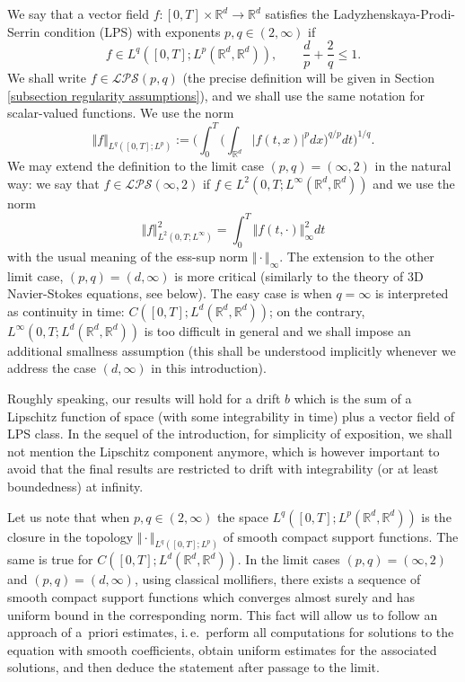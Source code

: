 \documentclass[a4paper,10pt]{article}
\begin{document}
We say that a vector field $f \colon [ 0,T] \times\mathbb{R} 
^{d}\rightarrow\mathbb{R}^{d}$ satisfies the Ladyzhenskaya-Prodi-Serrin condition
(LPS) with exponents $p,q\in(2,\infty)$ if
\begin{equation*}
f\in L^{q}([0,T];L^{p}(\mathbb{R}^{d},\mathbb{R}^{d}) )
,\qquad\frac{d}{p}+\frac{2}{q}\leq1.
\end{equation*}
We shall write $f\in\mathcal{LPS}(p,q)$ (the precise definition will be given in Section \ref{subsection regularity assumptions}), and we shall use the same notation for scalar-valued functions. We use the norm
\begin{equation*}
\Vert f \Vert_{L^{q}([0,T];L^{p})
}:=\bigg(\int_{0}^{T}\Big(\int_{\mathbb{R}^{d}} \vert f(t,x)
\vert^{p} dx \Big)^{q/p} dt \bigg) ^{1/q}.
\end{equation*}
We may extend the definition to the limit case $(p,q) =(
\infty,2)$ in the natural way: we say that $f\in\mathcal{LPS}(
\infty,2)$ if $f\in L^{2}(0,T;L^{\infty}(\mathbb{R}^{d}, 
\mathbb{R}^{d}) )$ and we use the norm 
\begin{equation*}
\Vert f \Vert_{L^{2}(0,T;L^{\infty})
}^{2}= \int_{0}^{T} \Vert f(t,\cdot) \Vert_{\infty}^{2}dt
\end{equation*}
with the usual meaning of the ess-sup norm $\Vert \cdot \Vert
_{\infty}$. The extension to the other limit case, $(p,q) =(
d,\infty)$ is more critical (similarly to the theory of 3D
Navier-Stokes equations, see below). The easy case is when $q=\infty$ is
interpreted as continuity in time: $C([ 0,T] ;L^{d}( 
\mathbb{R}^{d},\mathbb{R}^{d}) )$; on the contrary, $L^{\infty
}(0,T;L^{d}(\mathbb{R}^{d},\mathbb{R}^{d}) )$ is too
difficult in general and we shall impose an additional smallness assumption (this
shall be understood implicitly whenever we address the case $(d,\infty)$ in this introduction).

Roughly speaking, our results will hold for a drift $b$ which is the sum of
a Lipschitz function of space (with some integrability in time) plus a
vector field of LPS class. In the sequel of the introduction, for simplicity
of exposition, we shall not mention the Lipschitz component anymore, which
is however important to avoid that the final results are restricted to drift
with integrability (or at least boundedness) at infinity.

Let us note that when $p,q\in(2,\infty)$ the space $L^{q}([0,T];L^{p}(\mathbb{R}^{d}, 
\mathbb{R}^{d}))$ is the closure in the topology $\Vert
\cdot\Vert_{L^{q}([0,T];L^{p})}$ of smooth compact support
functions. The same is true for $C([ 0,T] ;L^{d}( 
\mathbb{R}^{d},\mathbb{R}^{d}))$. In the limit cases 
$(p,q) =(\infty,2)$ and $( p,q)
=(d,\infty)$, using classical mollifiers, there exists a sequence
of smooth compact support functions which converges almost surely and has
uniform bound in the corresponding norm. This fact will allow us to follow an approach of a~priori estimates, i.\,e.\ perform all computations for solutions to the equation with smooth coefficients, obtain uniform estimates for the associated solutions, and then deduce the statement after passage to the limit.
\end{document}
